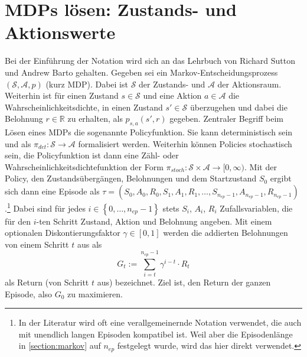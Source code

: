 \section{MDPs lösen: Zustands- und Aktionswerte}
\label{section:mdp_fundamentals}
Bei der Einführung der Notation wird sich an das Lehrbuch von Richard Sutton und Andrew Barto gehalten. \cite{Sutton1998}
Gegeben sei ein Markov-Entscheidungsprozess $(\mathcal{S}, \mathcal{A}, p)$ (kurz MDP).
Dabei ist $\mathcal{S}$ der Zustands- und $\mathcal{A}$ der Aktionsraum.
Weiterhin ist für einen Zustand $s\in \mathcal{S}$ und eine Aktion $a \in \mathcal{A}$ die Wahrscheinlichkeitsdichte, in einen Zustand $s' \in \mathcal{S}$ überzugehen und dabei die Belohnung $r \in \mathbb{R}$ zu erhalten, als $p_{s,a}(s', r)$ gegeben.
Zentraler Begriff beim Lösen eines MDPs die sogenannte Policyfunktion.
Sie kann deterministisch sein und als $\pi_{det}: \mathcal{S} \rightarrow \mathcal{A}$ formalisiert werden.
Weiterhin können Policies stochastisch sein, die Policyfunktion ist dann eine Zähl- oder Wahrscheinlichkeitsdichtefunktion der Form $\pi_{stoch}: \mathcal{S}\times\mathcal{A}\rightarrow [0, \infty)$.
Mit der Policy, den Zustandsübergängen, Belohnungen und dem Startzustand $S_0$ ergibt sich dann eine Episode als $\tau = \left(S_0, A_0, R_0, S_1, A_1, R_1, \dots, S_{n_{ep} - 1}, A_{n_{ep} - 1}, R_{n_{ep} - 1}\right)$.\footnote{
	In der Literatur wird oft eine verallgemeinernde Notation verwendet, die auch mit unendlich langen Episoden kompatibel ist.
	Weil aber die Episodenlänge in \ref{section:markov} auf $n_{ep}$ festgelegt wurde, wird das hier direkt verwendet.
}
Dabei sind für jedes $i \in \left\lbrace0, \dots, n_{ep} - 1\right\rbrace$ stets $S_i$, $A_i$, $R_i$ Zufallsvariablen, die für den $i$-ten Schritt Zustand, Aktion und Belohnung angeben.
Mit einem optionalen Diskontierungsfaktor $\gamma \in [0, 1]$ werden die addierten Belohnungen von einem Schritt $t$ aus als 
\begin{equation}
	G_t := \sum_{i=t}^{n_{ep} - 1} \gamma^{i - t} \cdot R_t
\end{equation}
als Return (von Schritt $t$ aus) bezeichnet.
Ziel ist, den Return der ganzen Episode, also $G_0$ zu maximieren.

